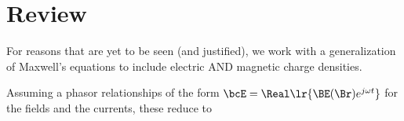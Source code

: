 %
%
%
%
%
%
%
%
%
%

\section{Review}

For reasons that are yet to be seen (and justified), we work with a generalization of Maxwell's equations to include
electric AND magnetic charge densities.



Assuming a phasor relationships of the form \( \bcE = \Real \lr{ \BE(\Br) e^{j \omega t}} \) for the fields and the currents, these reduce to




